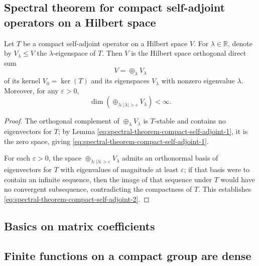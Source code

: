 \documentclass[reqno]{amsart} 
\def\eps{\varepsilon}
\begin{document}
\subsection{Spectral theorem for compact self-adjoint operators on a Hilbert space}
\label{sec:orgaec3806}
\begin{theorem}\label{thm:spectral-thm-self-adj}
  Let $T$ be a compact self-adjoint operator on a Hilbert space
  $V$.
  For $\lambda \in \mathbb{R}$,
  denote by $V_\lambda \leq V$ the $\lambda$-eigenspace of $T$.
  Then $V$ is the Hilbert space orthogonal direct sum
  \begin{equation}\label{eq:spectral-theorem-compact-self-adjoint-1}
    V = \oplus_\lambda V_\lambda
  \end{equation}
  of its kernel $V_0 = \ker(T)$ and its eigenspaces
  $V_\lambda$ with nonzero eigenvalue $\lambda$.  Moreover,
  for any $\eps > 0$,
  \begin{equation}\label{eq:spectral-theorem-compact-self-adjoint-2}
    \dim(\oplus_{\lambda : |\lambda| > \eps} V_\lambda ) < \infty.
  \end{equation}
\end{theorem}
\begin{proof}
  The orthogonal complement of $\oplus_\lambda V_\lambda$
  is $T$-stable and contains no eigenvectors for $T$;
  by
  Lemma \ref{eq:spectral-theorem-compact-self-adjoint-1},
  it is the zero space, giving \eqref{eq:spectral-theorem-compact-self-adjoint-1}.

  For each $\eps > 0$, the space
  $\oplus_{\lambda : |\lambda| > \eps} V_\lambda$ admits an
  orthonormal basis of eigenvectors for $T$ with eigenvalues
  of magnitude at least $\eps$; if that basis were to contain an
  infinite sequence, then the image of that sequence under $T$
  would have no convergent subsequence, contradicting the
  compactness of $T$.  This establishes
  \eqref{eq:spectral-theorem-compact-self-adjoint-2}.
\end{proof}

\subsection{Basics on matrix coefficients}
\label{sec:org14df4a0}

\subsection{Finite functions on a compact group are dense\label{sec:finite-functions-dense}}
\label{sec:org39a802e}
\end{document}
